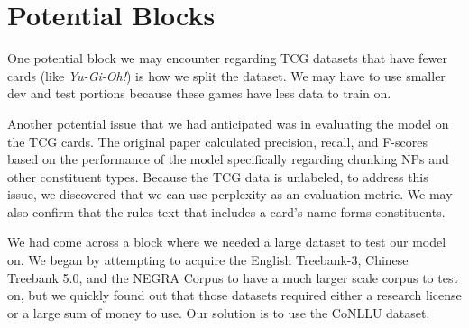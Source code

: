 \documentclass[11pt,a4paper]{article}
\begin{document}
\section{Potential Blocks}

One potential block we may encounter regarding TCG datasets that have fewer cards (like \emph{Yu-Gi-Oh!}) is how we split the dataset.
We may have to use smaller dev and test portions because these games have less data to train on.

Another potential issue that we had anticipated was in evaluating the model on the TCG cards.
The original paper calculated precision, recall, and F-scores based on the performance of the model specifically regarding chunking NPs and other constituent types.
Because the TCG data is unlabeled, to address this issue, we discovered that we can use perplexity as an evaluation metric.
We may also confirm that the rules text that includes a card’s name forms constituents.

We had come across a block where we needed a large dataset to test our model on.
We began by attempting to acquire the English Treebank-3, Chinese Treebank 5.0, and the NEGRA Corpus to have a much larger scale corpus to test on, but we quickly found out that those datasets required either a research license or a large sum of money to use.
Our solution is to use the CoNLLU dataset.



\end{document}
